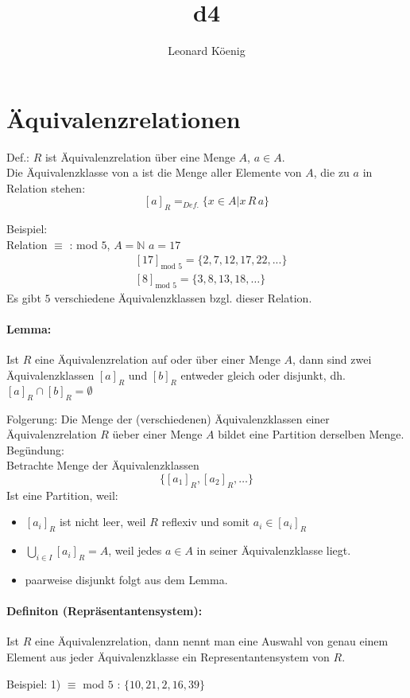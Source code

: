 \documentclass[10pt,a4paper]{article}
\author{Leonard K\"oenig}
\title{d4}
\begin{document}
\section{Äquivalenzrelationen}
Def.: $R$ ist \"Aquivalenzrelation \"uber eine Menge $A$, $a\in A$.\\
Die \"Aquivalenzklasse von a ist die Menge aller Elemente von $A$, die zu $a$ in Relation stehen:
\[
[a]_{R} =_{Def.} \{x \in A | x\,R\,a\}
\]

Beispiel:\\
Relation $\equiv$ : mod $5$, $A = \mathbb{N}$ $a=17$
\begin{align*}
&[17]_{\text{mod }5} = \{2,7,12,17,22,...\} \\
&[8]_{\text{mod }5} = \{3,8,13,18, \ldots\}
\end{align*}
Es gibt $5$ verschiedene \"Aquivalenzklassen bzgl. dieser Relation.

\paragraph{Lemma: } Ist $R$ eine \"Aquivalenzrelation auf oder \"uber einer Menge $A$, dann sind zwei \"Aquivalenzklassen $[a]_R$ und $[b]_R$ entweder gleich oder disjunkt, dh. $[a]_R \cap [b]_R = \emptyset$

Folgerung: Die Menge der (verschiedenen) \"Aquivalenzklassen einer \"Aquivalenzrelation $R$ \"ueber einer Menge $A$ bildet eine Partition derselben Menge.\\
Begündung:\\
Betrachte Menge der \"Aquivalenzklassen
\[
\{[a_1]_R,[a_2]_R,\ldots\}
\]
Ist eine Partition, weil:
\begin{itemize}
\item $[a_i]_R$ ist nicht leer, weil $R$ reflexiv und somit $a_i \in [a_i]_R$
\item $\bigcup_{i \in I} [a_i]_R = A$, weil jedes $a\in A$ in seiner \"Aquivalenzklasse liegt.
\item paarweise disjunkt folgt aus dem Lemma.
\end{itemize}
\paragraph{Definiton (Repr\"asentantensystem): }Ist $R$ eine Äquivalenzrelation, dann nennt man eine Auswahl von genau einem Element aus jeder Äquivalenzklasse ein Representantensystem von $R$.

Beispiel: 1) $\equiv$ mod $5$ : $\{10,21,2,16,39\}$
\end{document}
